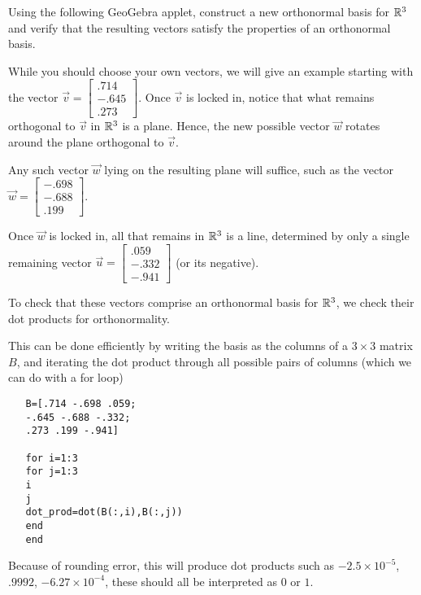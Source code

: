 \documentclass{ximera}
\begin{document}
\begin{exploration}
   Using the following GeoGebra applet, construct a new orthonormal basis for $\mathbb{R}^3$ and verify that the resulting vectors satisfy the properties of an orthonormal basis.

   \begin{center}
   \end{center}



   \begin{hint}

      While you should choose your own vectors, we will give an example starting with the vector $\vec{v}=\begin{bmatrix}
         .714\\-.645\\.273
      \end{bmatrix}$. Once $\vec{v}$ is locked in, notice that what remains orthogonal to $\vec{v}$ in $\mathbb{R}^3$ is a plane. Hence, the new possible vector $\vec{w}$ rotates around the plane orthogonal to $\vec{v}$.

      Any such vector $\vec{w}$ lying on the resulting plane will suffice, such as the vector $\vec{w}=\begin{bmatrix}
         -.698\\-.688\\.199
      \end{bmatrix}$.
  
   
   Once $\vec{w}$ is locked in, all that remains in $\mathbb{R}^3$ is a line, determined by only a single remaining vector $\vec{u}=\begin{bmatrix}
      .059\\-.332\\-.941
   \end{bmatrix}$ (or its negative).

   To check that these vectors comprise an orthonormal basis for $\mathbb{R}^3$, we check their dot products for orthonormality. 

   This can be done efficiently by writing the basis as the columns of a $3\times 3$ matrix $B$, and iterating the dot product through all possible pairs of columns (which we can do with a for loop)

   \begin{verbatim}
   B=[.714 -.698 .059;
   -.645 -.688 -.332;
   .273 .199 -.941]

   for i=1:3
   for j=1:3
   i
   j
   dot_prod=dot(B(:,i),B(:,j))
   end
   end
   \end{verbatim}

   Because of rounding error, this will produce dot products such as $-2.5\times 10^{-5}$, $.9992$, $-6.27\times10^{-4}$, these should all be interpreted as $0$ or $1$.

\end{hint}

\end{exploration}
\end{document}
